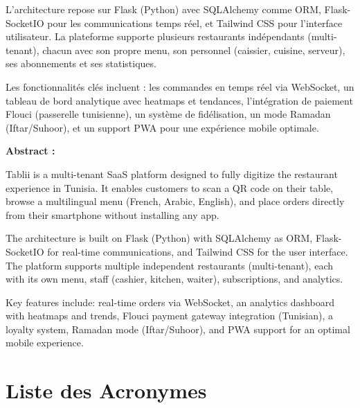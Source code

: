 \documentclass[12pt,a4paper]{report}
\begin{document}
L'architecture repose sur Flask (Python) avec SQLAlchemy comme ORM, Flask-SocketIO pour les 
communications temps r\'eel, et Tailwind CSS pour l'interface utilisateur. La plateforme supporte 
plusieurs restaurants ind\'ependants (multi-tenant), chacun avec son propre menu, son personnel 
(caissier, cuisine, serveur), ses abonnements et ses statistiques.

Les fonctionnalit\'es cl\'es incluent : les commandes en temps r\'eel via WebSocket, un tableau 
de bord analytique avec heatmaps et tendances, l'int\'egration de paiement Flouci (passerelle 
tunisienne), un syst\`eme de fid\'elisation, un mode Ramadan (Iftar/Suhoor), et un support PWA 
pour une exp\'erience mobile optimale.

\vspace{0.5cm}

\noindent\textbf{Abstract :}

Tablii is a multi-tenant SaaS platform designed to fully digitize the restaurant experience in Tunisia. 
It enables customers to scan a QR code on their table, browse a multilingual menu (French, 
Arabic, English), and place orders directly from their smartphone without installing any app.

The architecture is built on Flask (Python) with SQLAlchemy as ORM, Flask-SocketIO for 
real-time communications, and Tailwind CSS for the user interface. The platform supports 
multiple independent restaurants (multi-tenant), each with its own menu, staff (cashier, 
kitchen, waiter), subscriptions, and analytics.

Key features include: real-time orders via WebSocket, an analytics dashboard with heatmaps 
and trends, Flouci payment gateway integration (Tunisian), a loyalty system, Ramadan mode 
(Iftar/Suhoor), and PWA support for an optimal mobile experience.

\cleardoublepage
\tableofcontents
\cleardoublepage
\listoffigures
{}
\cleardoublepage
\listoftables
{}

\cleardoublepage
\chapter*{Liste des Acronymes}
\end{document}

